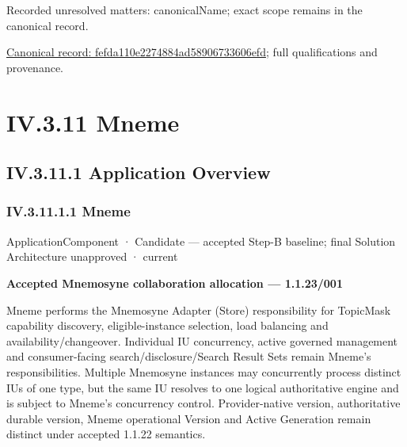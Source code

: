 {\small Recorded unresolved matters: canonicalName; exact scope remains in the canonical record.}\par
{\footnotesize \href{../../../../continuum/application/application-component/fefda110e2274884ad58906733606efd.md}{Canonical record: fefda110e2274884ad58906733606efd}; full qualifications and provenance.}\par
\section*{IV.3.11 Mneme}
\label{navigation:IV.3.11}

\subsection*{IV.3.11.1 Application Overview}
\label{navigation:IV.3.11.1}

\subsubsection*{IV.3.11.1.1 Mneme}
\label{navigation:IV.3.11.1.1}

\label{element:1af8a56358f7429fabfb57be66542a99}
{\small ApplicationComponent · Candidate — accepted Step-B baseline; final Solution Architecture unapproved · current}\par

\par\medskip\textbf{Accepted Mnemosyne collaboration allocation — 1.1.23/001}\par


Mneme performs the Mnemosyne Adapter (Store) responsibility for TopicMask capability discovery, eligible-instance selection, load balancing and availability/changeover. Individual IU concurrency, active governed management and consumer-facing search/disclosure/Search Result Sets remain Mneme’s responsibilities. Multiple Mnemosyne instances may concurrently process distinct IUs of one type, but the same IU resolves to one logical authoritative engine and is subject to Mneme’s concurrency control. Provider-native version, authoritative durable version, Mneme operational Version and Active Generation remain distinct under accepted 1.1.22 semantics.



